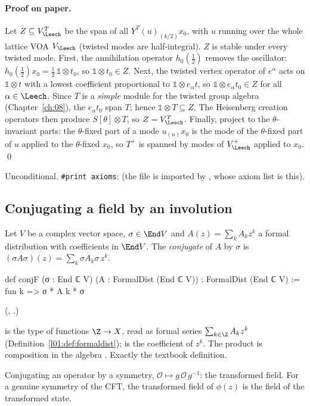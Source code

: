 \paragraph{Proof on paper.}  Let $Z\subseteq V_\Leech^T$ be the span of all $Y^T(u)_{(k/2)}x_0$,
with $u$ running over the whole lattice VOA $V_\Leech$ (twisted modes are half-integral).  $Z$ is
stable under every twisted mode.  First, the annihilation operator $h_0(\tfrac12)$ removes the
oscillator: $h_0(\tfrac12)x_0=\tfrac12\,\mathbb 1\otimes t_0$, so $\mathbb 1\otimes t_0\in Z$.  Next,
the twisted vertex operator of $e^\alpha$ acts on $\mathbb 1\otimes t$ with a lowest coefficient
proportional to $\mathbb 1\otimes e_\alpha t$, so $\mathbb 1\otimes e_\alpha t_0\in Z$ for all
$\alpha\in\Leech$.  Since $T$ is a \emph{simple} module for the twisted group algebra
(Chapter~\ref{ch:08}), the $e_\alpha t_0$ span $T$; hence $\mathbb 1\otimes T\subseteq Z$.  The
Heisenberg creation operators then produce $S[\theta]\otimes T$, so $Z=V_\Leech^T$.  Finally,
project to the $\theta$-invariant parts: the $\theta$-fixed part of a mode $u_{(n)}x_0$ is the mode
of the $\theta$-fixed part of $u$ applied to the $\theta$-fixed $x_0$, so $T^+$ is spanned by modes of
$V_\Leech^+$ applied to $x_0$. \qed

\begin{status}
Unconditional.  \texttt{\#print axioms}:  (the file is
imported by , whose axiom list is this).
\end{status}

\subsection{Conjugating a field by an involution}

\begin{definition}\label{ch14:def:conjF}
Let $V$ be a complex vector space, $\sigma\in\End V$ and $A(z)=\sum_k A_k z^k$ a formal
distribution with coefficients in $\End V$.  The \emph{conjugate} of $A$ by $\sigma$ is
$(\sigma A\sigma)(z)=\sum_k \sigma A_k\sigma\, z^k$.
\end{definition}
\begin{leancode}
def conjF (σ : End ℂ V) (A : FormalDist (End ℂ V)) : FormalDist (End ℂ V) :=
  fun k => σ * A k * σ
\end{leancode}
(, .)

\begin{dictionary}
 is the type of functions $\Z\to X$, read as formal series
$\sum_{k\in\Z}A_kz^k$ (Definition~\ref{l01:def:formaldist});  is the coefficient of $z^k$.  The product
 is composition in the algebra .  Exactly the textbook definition.
\end{dictionary}
\begin{physics}
Conjugating an operator by a symmetry, $\mathcal O\mapsto g\,\mathcal O\,g^{-1}$: the transformed field. For a genuine symmetry of the CFT, the transformed field of $\phi(z)$ is the field of the transformed state.
\end{physics}


